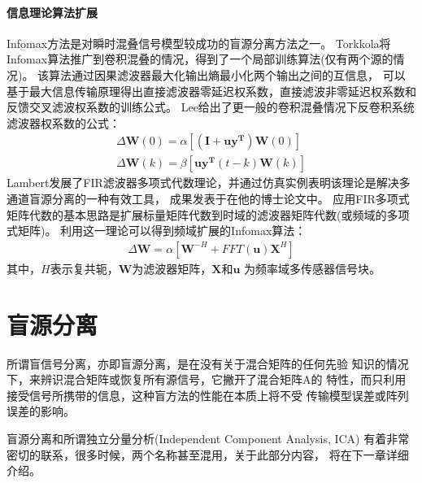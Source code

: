 \paragraph*{信息理论算法扩展}
Infomax方法是对瞬时混叠信号模型较成功的盲源分离方法之一。
Torkkola将Infomax算法推广到卷积混叠的情况，得到了一个局部训练算法(仅有两个源的情况)。
该算法通过因果滤波器最大化输出熵最小化两个输出之间的互信息，
可以基于最大信息传输原理得出直接滤波器零延迟权系数，直接滤波非零延迟权系数和反馈交叉滤波权系数的训练公式。
Lee给出了更一般的卷积混叠情况下反卷积系统滤波器权系数的公式：
\begin{eqnarray}
\Delta\bm{W}(0)	= \alpha [\bm{(I+uy^T)W}(0)] \\
\Delta\bm{W}(k)	= \beta [\bm{uy^T}(t-k)\bm{W}(k)]
\end{eqnarray}
Lambert发展了FIR滤波器多项式代数理论，并通过仿真实例表明该理论是解决多通道盲源分离的一种有效工具，
成果发表于在他的博士论文中。
应用FIR多项式矩阵代数的基本思路是扩展标量矩阵代数到时域的滤波器矩阵代数(或频域的多项式矩阵)。
利用这一理论可以得到频域扩展的Infomax算法：
\begin{eqnarray}
\Delta\bm{W} = \alpha [\bm{W}^{-H}+FFT(\bm{u})\bm{X}^H]
\end{eqnarray}
其中，$H$表示复共轭，$\bm{W}$为滤波器矩阵，$\bm{X}$和$\bm{u}$
为频率域多传感器信号块。

\section{盲源分离}
所谓盲信号分离，亦即盲源分离，是在没有关于混合矩阵的任何先验
知识的情况下，来辨识混合矩阵或恢复所有源信号，它撇开了混合矩阵A的
特性，而只利用接受信号所携带的信息，这种盲方法的性能在本质上将不受
传输模型误差或阵列误差的影响。

盲源分离和所谓独立分量分析(Independent Component Analysis, ICA)
有着非常密切的联系，很多时候，两个名称甚至混用，关于此部分内容，
将在下一章详细介绍。


